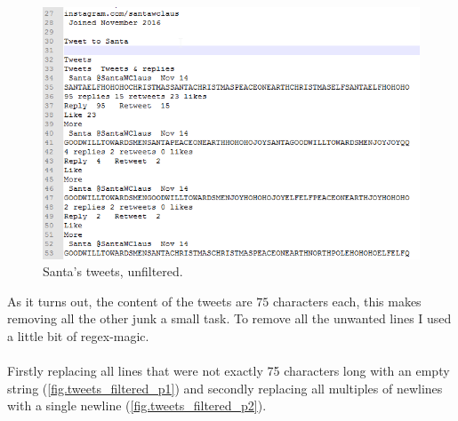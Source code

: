 \documentclass[writeup.tex]{subfiles}
\begin{document}
		\begin{figure}[H]
			\centering
			\includegraphics[width=.5\linewidth]{screenshots/tweets_unfiltered}
			\caption{Santa's tweets, unfiltered.}
			\label{fig.tweets_unfiltered}
		\end{figure}

		As it turns out, the content of the tweets are $75$ characters each, this makes removing all the other junk a small task. To remove all the unwanted lines I used a little bit of regex-magic. \\
		\\
		Firstly replacing all lines that were not exactly 75 characters long with an empty string (\autoref{fig.tweets_filtered_p1}) and secondly replacing all multiples of newlines with a single newline (\autoref{fig.tweets_filtered_p2}).
\end{document}
